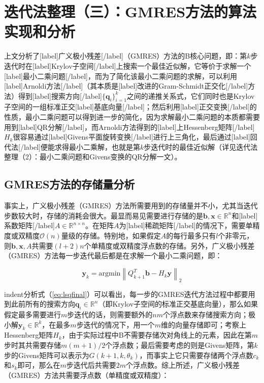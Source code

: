 \documentclass[UTF8,nofonts]{ctexart}
\begin{document}

\section*{迭代法整理（三）：GMRES方法的算法实现和分析}

上文分析了[label]广义极小残差[/label]（GMRES）方法的B核心问题，即：第$k$步迭代时在[label]Krylov子空间[/label]上搜索一个最佳近似解，它等价于求解一个[label]最小二乘问题[/label]，而为了简化该最小二乘问题的求解，可以利用[label]Arnoldi方法[/label]（其本质是[label]改进的Gram-Schmidt正交化[/label]方法）得到[label]搜索方向[/label]$\{\boldsymbol{q}_i\}_{i=1}^k$之间的递推关系式，它们同时也是Krylov子空间的一组标准正交[label]基底向量[/label]；然后利用[label]正交变换[/label]的性质，最小二乘问题可以得到进一步的简化，因为求解最小二乘问题的本质都需要用到[label]QR分解[/label]，而Arnoldi方法得到的[label]上Hessenberg矩阵[/label]$H_k$很容易通过[label]Givens平面旋转变换[/label]进行上三角化，最后通过[label]回代法[/label]便能求得最小二乘解，也就是第$k$步迭代时的最佳近似解（详见迭代法整理（2）：最小二乘问题和Givens变换的QR分解一文）。

\subsection*{GMRES方法的存储量分析}

事实上，广义极小残差（GMRES）方法所需要用到的存储量并不小，尤其当迭代步数较大时，存储的消耗会很大。最显而易见需要进行存储的是$\boldsymbol{b},\boldsymbol{x}\in\mathbb{R}^{n}$和[label]系数矩阵[/label]$A\in\mathbb{R}^{n \times n}$。在矩阵$A$为[label]稀疏矩阵[/label]的情况下，需要单精度或双精度$\mathcal{O}(n)$量级的存储。特别地，如果假定$A$的每行最多只有$l$个非零元，则$\boldsymbol{b},\boldsymbol{x},A$共需要$(l+2)n$个单精度或双精度浮点数的存储。另外，广义极小残差（GMRES）方法每一步迭代最后都是在求解一个最小二乘问题，即：

\begin{equation}
\label{eq:lsqfinal}
\boldsymbol{y}_k=\text{argmin}\left\|Q^T_{k+1}\boldsymbol{b}-H_k\boldsymbol{y}\right\|_2
\end{equation}

indent分析式（\ref{eq:lsqfinal}）可以看出，每一步的GMRES迭代方法过程中都要用到此前所有的搜索方向$\boldsymbol{q}_i\in\mathbb{R}^n$（即Krylov子空间的标准正交基底向量），那么如果假定最多需要进行$m$步迭代的话，则需要额外的$nm$个浮点数来存储搜索方向；极小解$\boldsymbol{y}_k\in\mathbb{R}^{k}$，在最多$m$步迭代的情况下，用一个$m$维的向量存储即可；考察上Hessenberg矩阵$H_k$，由于实际过程中B不需要存储次对角线上的元素，因此在第$m$步时其共需要存储$m(m+1)/2$个浮点数；最后需要考虑的则是Givens矩阵，第$k$步的Givens矩阵可以表示为$G(k+1,k,\theta_k)$，而事实上它只需要存储两个浮点数$c_k$和$s_k$即可，那么在$m$步迭代后共需要$2m$个浮点数。综上所述，广义极小残差（GMRES）方法共需要浮点数（单精度或双精度）：
\end{document}
